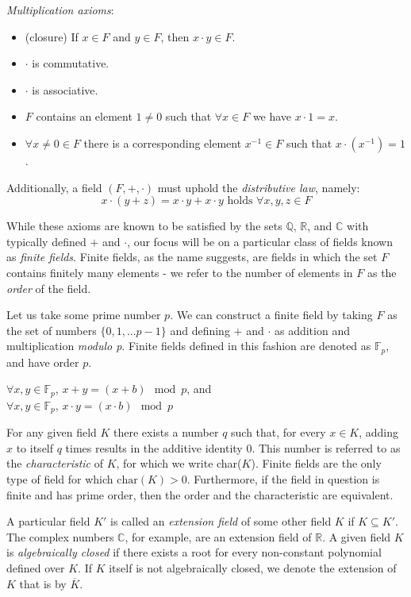 \noindent
\emph{Multiplication axioms}:
\begin{itemize}
\item (closure) If $x \in F$ and $y \in F$, then $x \cdot y \in F$.
\item $\cdot$ is commutative.
\item $\cdot$ is associative.
\item $F$ contains an element $1 \neq 0$ such that $\forall x \in F$ we have $x \cdot 1 = x$.
\item $\forall x \neq 0 \in F$ there is a corresponding element $x^{-1} \in F$ such that $x \cdot (x^{-1}) = 1$.
\end{itemize}

Additionally, a field $(F,+,\cdot)$ must uphold the \emph{distributive law}, namely:
$$
 x \cdot (y + z) = x \cdot y + x \cdot y \text{ holds } \forall x,y,z \in F
$$

While these axioms are known to be satisfied by the sets $\mathbb{Q}$, $\mathbb{R}$, and $\mathbb{C}$ with typically defined $+$ and $\cdot$, our focus will be on a particular class of fields known as \emph{finite fields}. Finite fields, as the name suggests, are fields in which the set $F$ contains finitely many elements - we refer to the number of elements in $F$ as the \emph{order} of the field.

Let us take some prime number $p$. We can construct a finite field by taking $F$ as the set of numbers $\{0, 1, ... p-1\}$ and defining $+$ and $\cdot$ as addition and multiplication \emph{modulo p}. Finite fields defined in this fashion are denoted as $\mathbb{F}_p$, and have order $p$.
\begin{center}
$\forall x,y \in \mathbb{F}_p$, $x + y = (x + b) \mod{p}$, and\\
$\forall x,y \in \mathbb{F}_p$, $x \cdot y = (x \cdot b) \mod{p}$\\
\end{center}

For any given field $K$ there exists a number $q$ such that, for every $x \in K$, adding $x$ to itself $q$ times results in the additive identity 0. This number is referred to as the \emph{characteristic} of $K$, for which we write char($K$). Finite fields are the only type of field for which $\text{char}(K) > 0$. Furthermore, if the field in question is finite and has prime order, then the order and the characteristic are equivalent.

A particular field $K'$ is called an \emph{extension field} of some other field $K$ if $K \subseteq K'$. The complex numbers $\mathbb{C}$, for example, are an extension field of $\mathbb{R}$. A given field $K$ is \emph{algebraically closed} if there exists a root for every non-constant polynomial defined over $K$. If $K$ itself is not algebraically closed, we denote the extension of $K$ that is by $\overline{K}$.

